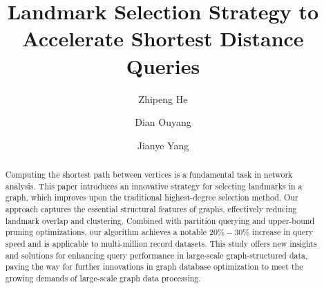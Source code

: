 \documentclass[sigconf]{acmart}
\begin{document}
\title{Landmark Selection Strategy to Accelerate Shortest Distance Queries}


\author{Zhipeng He}

\author{Dian Ouyang}

\author{Jianye Yang}

\renewcommand{\shortauthors}{Z. He, D. Ouyang, J. Yang}

\begin{abstract}
Computing the shortest path between vertices is a fundamental task in network analysis. This paper introduces an innovative strategy for selecting landmarks in a graph, which improves upon the traditional highest-degree selection method. Our approach captures the essential structural features of graphs, effectively reducing landmark overlap and clustering. Combined with partition querying and upper-bound pruning optimizations, our algorithm achieves a notable $20 \%-30 \%$ increase in query speed and is applicable to multi-million record datasets. This study offers new insights and solutions for enhancing query performance in large-scale graph-structured data, paving the way for further innovations in graph database optimization to meet the growing demands of large-scale graph data processing.\par

\end{abstract}
\end{document}
